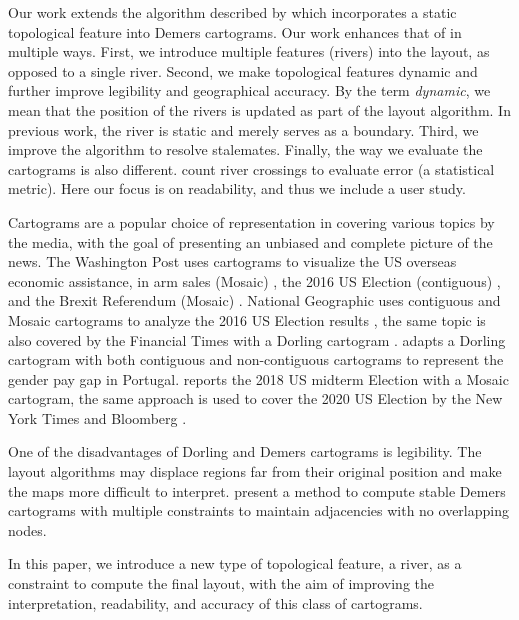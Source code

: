 Our work extends the algorithm described by  which incorporates a static topological feature into Demers cartograms. Our work enhances that of \citeauthor{tong2018Cartograms} in multiple ways. First, we introduce multiple features (rivers) into the layout, as opposed to a single river. Second, we make topological features dynamic and further improve legibility and geographical accuracy. By the term \textit{dynamic}, we mean that the position of the rivers is updated as part of the layout algorithm. In previous work, the river is static and merely serves as a boundary. Third, we improve the algorithm to resolve stalemates. Finally, the way we evaluate the cartograms is also different. \citeauthor{tong2018Cartograms} count river crossings to evaluate error (a statistical metric). Here our focus is on readability, and thus we include a user study.

Cartograms are a popular choice of representation in covering various topics by the media, with the goal of presenting an unbiased and complete picture of the news. The Washington Post uses cartograms to visualize the US overseas economic assistance, in arm sales (Mosaic) \cite{bearak2016Everything}, the 2016 US Election (contiguous) \cite{gamio2016Election}, and the Brexit Referendum (Mosaic) \cite{taylor2016What}. National Geographic uses contiguous and Mosaic cartograms to analyze the 2016 US Election results \cite{miller2016Election}, the same topic is also covered by the Financial Times with a Dorling cartogram \cite{stabe2016Search}.  adapts a Dorling cartogram with both contiguous and non-contiguous cartograms to represent the gender pay gap in Portugal.  reports the 2018 US midterm Election with a Mosaic cartogram, the same approach is used to cover the 2020 US Election by the New York Times \cite{thelearningnetwork2020What} and Bloomberg \cite{mccartney20202020}.



One of the disadvantages of Dorling and Demers cartograms is legibility. The layout algorithms may displace regions far from their original position and make the maps more difficult to interpret.  present a method to compute stable Demers cartograms with multiple constraints to maintain adjacencies with no overlapping nodes.

In this paper, we introduce a new type of topological feature, a river, as a constraint to compute the final layout, with the aim of improving the interpretation, readability, and accuracy of this class of cartograms.